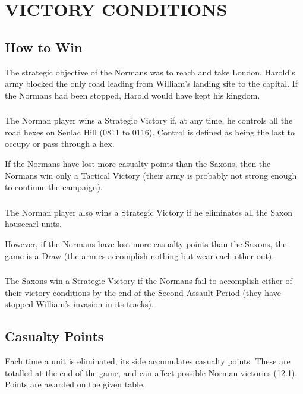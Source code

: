 \section{VICTORY CONDITIONS}

\subsection{How to Win}

The strategic objective of the Normans was to reach and take London. Harold's army blocked the only road leading from William's landing site to the capital. If the Normans had been stopped, Harold would have kept his kingdom.

\subsubsection[Norman Victory]{} The Norman player wins a Strategic Victory if, at any time, he controls all the road hexes on Senlac Hill (0811 to 0116). Control is defined as being the last to occupy or pass through a hex.

If the Normans have lost more casualty points than the Saxons, then the Normans win only a Tactical Victory (their army is probably not strong enough to continue the campaign).

\subsubsection[Norman Victory Alt]{} The Norman player also wins a Strategic Victory if he eliminates all the Saxon housecarl units.

However, if the Normans have lost more casualty points than the Saxons, the game is a Draw (the armies accomplish nothing but wear each other out).

\subsubsection[Saxon Victory]{} The Saxons win a Strategic Victory if the Normans fail to accomplish either of their victory conditions by the end of the Second Assault Period (they have stopped William's invasion in its tracks).

\subsection{Casualty Points}

Each time a unit is eliminated, its side accumulates casualty points. These are totalled at the end of the game, and can affect possible Norman victories (12.1). Points are awarded on the given table.

